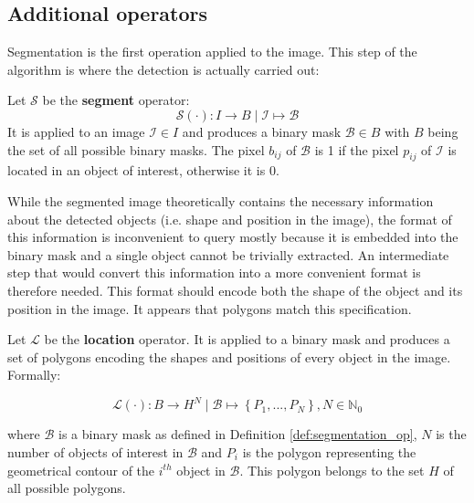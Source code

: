 \subsection{Additional operators}
\label{ssec:other_operators}

Segmentation is the first operation applied to the image. This step of the algorithm is where the detection is actually carried out:
 
\begin{definition} \label{def:segmentation_op}
Let $\mathcal{S}$ be the \textbf{segment} operator:
\begin{equation}
	\label{eqn:operator_segment}
	\mathcal{S}(\cdot) : I \rightarrow B \mid \mathcal{I} \mapsto \mathcal{B}
\end{equation}
It is applied to an image $\mathcal{I} \in I$ and produces a binary mask $\mathcal{B} \in B$ with $B$ being the set of all possible binary masks. The pixel $b_{ij}$ of $\mathcal{B}$ is 1 if the pixel $p_{ij}$ of $\mathcal{I}$ is located in an object of interest, otherwise it is 0.
\end{definition}

While the segmented image theoretically contains the necessary information about the detected objects (i.e. shape and position in the image), the format of this information is inconvenient to query mostly because it is embedded into the binary mask and a single object cannot be trivially extracted. An intermediate step that would convert this information into a more convenient format is therefore needed. This format should encode both the shape of the object and its position in the image. It appears that polygons match this specification. 

\begin{definition} \label{def:locate_op}
Let $\mathcal{L}$ be the \textbf{location} operator. It is applied to a binary mask and produces a set of polygons encoding the shapes and positions of every object in the image. Formally:

\begin{equation}
	\mathcal{L}(\cdot) : B \rightarrow H^N \mid \mathcal{B} \mapsto \left\{P_1,  ..., P_N\right\}, N \in \mathbb{N}_0
\end{equation}

where $\mathcal{B}$ is a binary mask as defined in Definition \ref{def:segmentation_op}, $N$ is the number of objects of interest in $\mathcal{B}$ and $P_i$ is the polygon representing the geometrical contour of the $i^{th}$ object in $\mathcal{B}$. This polygon belongs to the set $H$ of all possible polygons.
\end{definition}

